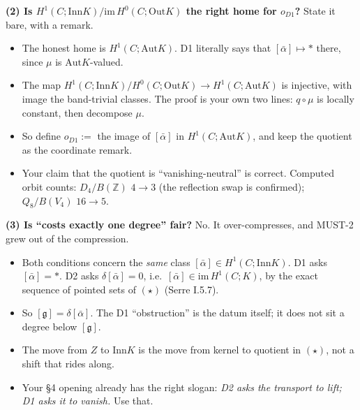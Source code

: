 \documentclass[10pt]{article}
\newcommand{\Z}{\mathbb{Z}}
\newcommand{\Inn}{\mathrm{Inn}}\newcommand{\Out}{\mathrm{Out}}\newcommand{\Aut}{\mathrm{Aut}}
\begin{document}
\textbf{(2) Is $H^1(C;\Inn K)/\mathrm{im}\,H^0(C;\Out K)$ the right home for $o_{D1}$?} State it bare, with a remark.
\begin{itemize}
\item The honest home is $H^1(C;\Aut K)$. D1 literally says that $[\bar\alpha]\mapsto *$ there, since $\mu$ is $\Aut K$-valued.
\item The map $H^1(C;\Inn K)/H^0(C;\Out K)\to H^1(C;\Aut K)$ is injective, with image the band-trivial classes. The proof is your own two lines: $q\circ\mu$ is locally constant, then decompose $\mu$.
\item So define $o_{D1}:=$ the image of $[\bar\alpha]$ in $H^1(C;\Aut K)$, and keep the quotient as the coordinate remark.
\item Your claim that the quotient is ``vanishing-neutral'' is correct. Computed orbit counts: $D_4/B(\Z)$ $4\to3$ (the reflection swap is confirmed); $Q_8/B(V_4)$ $16\to5$.
\end{itemize}

\textbf{(3) Is ``costs exactly one degree'' fair?} No. It over-compresses, and MUST-2 grew out of the compression.
\begin{itemize}
\item Both conditions concern the \emph{same} class $[\bar\alpha]\in H^1(C;\Inn K)$. D1 asks $[\bar\alpha]=*$. D2 asks $\delta[\bar\alpha]=0$, i.e.\ $[\bar\alpha]\in\mathrm{im}\,H^1(C;K)$, by the exact sequence of pointed sets of $(\star)$ (Serre I.5.7).
\item So $[\mathfrak g]=\delta[\bar\alpha]$. The D1 ``obstruction'' is the datum itself; it does not sit a degree below $[\mathfrak g]$.
\item The move from $Z$ to $\Inn K$ is the move from kernel to quotient in $(\star)$, not a shift that rides along.
\item Your \S4 opening already has the right slogan: \emph{D2 asks the transport to lift; D1 asks it to vanish.} Use that.
\end{itemize}
\end{document}
